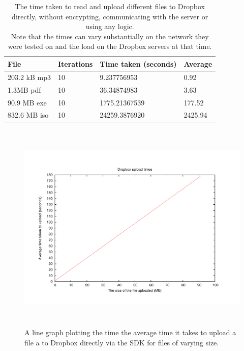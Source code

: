 \documentclass[12pt, titlepage]{article}
\begin{document}
\bigskip
\begin{table}[h!]
\begin{center}
    \begin{tabular}{ | l | l | l | l |}
    \hline
    \textbf{File} & \textbf{Iterations} & \textbf{Time taken (seconds)} & \textbf{Average} \\ \hline
    
    203.2 kB mp3 & 10 & 9.237756953 & 0.92 \\ \hline
    1.3MB pdf & 10 & 36.34874983 & 3.63 \\ \hline
    90.9 MB exe & 10 & 1775.21367539  & 177.52 \\ \hline
    832.6 MB iso & 10 & 24259.3876920 & 2425.94 \\ \hline
    
    \end{tabular}
    \caption{The time taken to read and upload different files to Dropbox directly, without encrypting, communicating with the server or using any logic. \\ Note that the times can vary substantially on the network they were tested on and the load on the Dropbox servers at that time.} \label{tab:uploadDropboxBenchmark}
    \end{center}
\end{table}

\begin{figure}[!t]
\centerline{\includegraphics[height=4.0in,width=7in,angle=0]{plots/dropboxUpload/dropboxUploadTimes.pdf}}
\caption{A line graph plotting the time the average time it takes to upload a file a to Dropbox directly via the SDK for files of varying size.}
\label{fig:loginLineGraph}
\end{figure}
\end{document}
